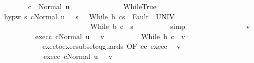 \begin{isabellebody}
\ \ \ \ \ \ \isamarkupfalse%
\ {\isachardoublequoteopen}{\isasymGamma}{\isasymturnstile}c{\isacharprime}{\isacharprime}\ {\isasymdown}\ Normal\ u{\isachardoublequoteclose}\isacommand{{\isachardot}}\isamarkupfalse%
\isanewline
\ \ \ \ \ \ \isamarkupfalse%
\isanewline
\ \ \ \ \ \ \isamarkupfalse%
\ WhileTrue\ \isanewline
\ \ \ \ \ \ \isamarkupfalse%
\ hyp{\isacharunderscore}w{\isacharcolon}\ {\isachardoublequoteopen}{\isasymforall}s{\isacharprime}{\isachardot}\ {\isasymGamma}{\isasymturnstile}{\isasymlangle}c{\isacharprime}{\isacharcomma}Normal\ u\ {\isasymrangle}\ {\isasymRightarrow}\ s{\isacharprime}\ \ {\isasymlongrightarrow}\ {\isasymGamma}{\isasymturnstile}{\isasymlangle}While\ b\ c{\isacharprime}{\isacharcomma}s{\isacharprime}\ {\isasymrangle}\ {\isasymRightarrow}{\isasymnotin}Fault\ {\isacharbackquote}\ UNIV\ \isanewline
\ \ \ \ \ \ \ \ \ \ \ \ \ \ \ \ \ \ \ \ \ \ \ \ {\isasymlongrightarrow}\ {\isasymGamma}{\isasymturnstile}While\ b\ c{\isacharprime}{\isacharprime}\ {\isasymdown}\ s{\isacharprime}{\isachardoublequoteclose}\isanewline
\ \ \ \ \ \ \ \ \isamarkupfalse%
\ simp\isanewline
\ \ \ \ \ \ \isacommand{{\isacharbraceleft}}\isamarkupfalse%
\isanewline
\ \ \ \ \ \ \ \ \isamarkupfalse%
\ v\isanewline
\ \ \ \ \ \ \ \ \isamarkupfalse%
\ exec{\isacharunderscore}c{\isacharprime}{\isacharprime}{\isacharcolon}\ {\isachardoublequoteopen}{\isasymGamma}{\isasymturnstile}{\isasymlangle}c{\isacharprime}{\isacharprime}{\isacharcomma}Normal\ u\ {\isasymrangle}\ {\isasymRightarrow}\ v{\isachardoublequoteclose}\isanewline
\ \ \ \ \ \ \ \ \isamarkupfalse%
\ {\isachardoublequoteopen}{\isasymGamma}{\isasymturnstile}While\ b\ c{\isacharprime}{\isacharprime}\ {\isasymdown}\ v{\isachardoublequoteclose}\isanewline
\ \ \ \ \ \ \ \ \isamarkupfalse%
\ {\isacharminus}\ \isanewline
\ \ \ \ \ \ \ \ \ \ \isamarkupfalse%
\ exec{\isacharunderscore}to{\isacharunderscore}exec{\isacharunderscore}subseteq{\isacharunderscore}guards\ {\isacharbrackleft}OF\ c{\isacharprime}{\isacharprime}{\isacharunderscore}c{\isacharprime}\ exec{\isacharunderscore}c{\isacharprime}{\isacharprime}{\isacharbrackright}\ \isamarkupfalse%
\ v{\isacharprime}\ \isanewline
\ \ \ \ \ \ \ \ \ \ \ \ exec{\isacharunderscore}c{\isacharprime}{\isacharcolon}\ {\isachardoublequoteopen}{\isasymGamma}{\isasymturnstile}{\isasymlangle}c{\isacharprime}{\isacharcomma}Normal\ u\ {\isasymrangle}\ {\isasymRightarrow}\ v{\isacharprime}{\isachardoublequoteclose}\ \isanewline

\end{isabellebody}
